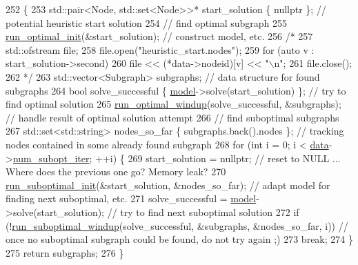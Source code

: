 \begin{DoxyCode}
252                                                          \{
253     std::pair<Node, std::set<Node>>* start\_solution \{ \textcolor{keyword}{nullptr} \};      \textcolor{comment}{// potential heuristic start solution}
254     \textcolor{comment}{// find optimal subgraph}
255     \hyperlink{classderegnet_1_1DeregnetFinder_ae0335349d6a60ee204d10bf8b7366cfa}{run\_optimal\_init}(&start\_solution);                                \textcolor{comment}{// construct model,
       etc.}
256 \textcolor{comment}{/*}
257 \textcolor{comment}{    std::ofstream file;}
258 \textcolor{comment}{    file.open("heuristic\_start.nodes");}
259 \textcolor{comment}{    for (auto v : start\_solution->second)}
260 \textcolor{comment}{        file << (*data->nodeid)[v] << "\(\backslash\)n";}
261 \textcolor{comment}{    file.close();}
262 \textcolor{comment}{*/}
263     std::vector<Subgraph> subgraphs;                                  \textcolor{comment}{// data structure for found subgraphs}
264     \textcolor{keywordtype}{bool} solve\_successful \{ \hyperlink{classderegnet_1_1DeregnetFinder_ad922d8e38124b4c75daac29a928fcf5b}{model}->solve(start\_solution) \};           \textcolor{comment}{// try to find optimal solution}
265     \hyperlink{classderegnet_1_1DeregnetFinder_a92610c1444ba271820e64d224ec64bb7}{run\_optimal\_windup}(solve\_successful, &subgraphs);                 \textcolor{comment}{// handle result of
       optimal solution attempt}
266     \textcolor{comment}{// find suboptimal subgraphs}
267     std::set<std::string> nodes\_so\_far \{ subgraphs.back().nodes \};    \textcolor{comment}{// tracking nodes contained in some
       already found subgraph}
268     \textcolor{keywordflow}{for} (\textcolor{keywordtype}{int} i = 0; i < \hyperlink{classderegnet_1_1DeregnetFinder_ab158f2a6bb7f39ed3d6e4a9ffe568232}{data}->\hyperlink{classderegnet_1_1DeregnetData_adb7428cd99112156ae9f80187af9ebbe}{num\_subopt\_iter}; ++i) \{
269         start\_solution = \textcolor{keyword}{nullptr};                                     \textcolor{comment}{// reset to NULL ... Where does the
       previous one go? Memory leak?}
270         \hyperlink{classderegnet_1_1DeregnetFinder_ad996cee997a5db4e09016a6f725a6701}{run\_suboptimal\_init}(&start\_solution, &nodes\_so\_far);          \textcolor{comment}{// adapt model for
       finding next suboptimal, etc.}
271         solve\_successful = \hyperlink{classderegnet_1_1DeregnetFinder_ad922d8e38124b4c75daac29a928fcf5b}{model}->solve(start\_solution);              \textcolor{comment}{// try to find next suboptimal
       solution}
272         \textcolor{keywordflow}{if} (!\hyperlink{classderegnet_1_1DeregnetFinder_a4021d92d787877187a24dcbaf0c1bad1}{run\_suboptimal\_windup}(solve\_successful, &subgraphs, &nodes\_so\_far, i))   
         \textcolor{comment}{// once no suboptimal subgraph could be found, do not try again ;)}
273             \textcolor{keywordflow}{break};
274     \}
275     \textcolor{keywordflow}{return} subgraphs;
276 \}
\end{DoxyCode}
